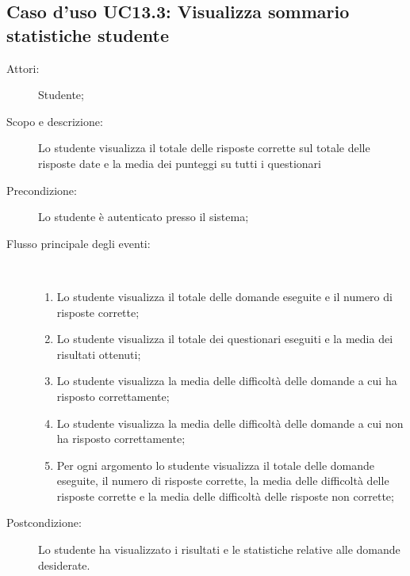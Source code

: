 \subsection{Caso d'uso UC13.3: Visualizza sommario statistiche studente}\begin{description}
	\item[Attori:] Studente;
	\item[Scopo e descrizione:] Lo studente visualizza il totale delle risposte corrette sul totale delle risposte date e la media dei punteggi su tutti i questionari
	\item[Precondizione:] Lo studente è autenticato presso il sistema;
	
	\item[Flusso principale degli eventi:] \ 
	\begin{enumerate}
		\item Lo studente visualizza il totale delle domande eseguite e il numero di risposte corrette;
		\item Lo studente visualizza il totale dei questionari eseguiti e la media dei risultati ottenuti;
		\item Lo studente visualizza la media delle difficoltà delle domande a cui ha risposto correttamente;
		\item Lo studente visualizza la media delle difficoltà delle domande a cui non ha risposto correttamente;
		\item Per ogni argomento lo studente visualizza il totale delle domande eseguite, il numero di risposte corrette, la media delle difficoltà delle risposte corrette e la media delle difficoltà delle risposte non corrette;
		
	\end{enumerate}
	\item[Postcondizione:] Lo studente ha visualizzato i risultati e le statistiche relative alle domande desiderate.
\end{description}
\hypertarget{UC14}{}
